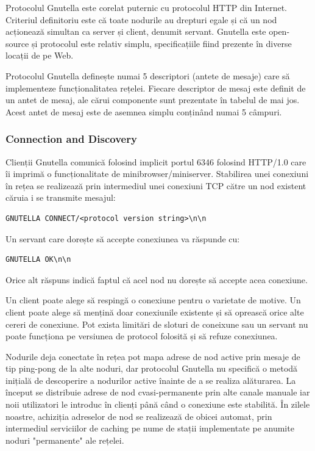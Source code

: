 Protocolul Gnutella este corelat puternic cu protocolul HTTP din Internet.
Criteriul definitoriu este că toate nodurile au drepturi egale și că un nod
acționează simultan ca server și client, denumit servant. Gnutella este
open-source și protocolul este relativ simplu, specificațiile fiind prezente
în diverse locații de pe Web.

Protocolul Gnutella definește numai 5 descriptori (antete de mesaje) care să
implementeze funcționalitatea rețelei. Fiecare descriptor de mesaj este
definit de un antet de mesaj, ale cărui componente sunt prezentate în tabelul
de mai jos. Acest antet de mesaj este de asemnea simplu conținând numai 5
câmpuri.

\subsubsection{Connection and Discovery}

Clienții Gnutella comunică folosind implicit portul 6346 folosind HTTP/1.0
care îi imprimă o funcționalitate de minibrowser/miniserver. Stabilirea unei
conexiuni în rețea se realizează prin intermediul unei conexiuni TCP către un
nod existent căruia i se transmite mesajul:

\begin{verbatim}
GNUTELLA CONNECT/<protocol version string>\n\n
\end{verbatim}

Un servant care dorește să accepte conexiunea va răspunde cu:
\begin{verbatim}
GNUTELLA OK\n\n
\end{verbatim}

Orice alt răspuns indică faptul că acel nod nu dorește să accepte acea
conexiune.

Un client poate alege să respingă o conexiune pentru o varietate de motive. Un
client poate alege să mențină doar conexiunile existente și să oprească orice
alte cereri de conexiune. Pot exista limitări de sloturi de coneixune sau un
servant nu poate funcționa pe versiunea de protocol folosită și să refuze
conexiunea.

Nodurile deja conectate în rețea pot mapa adrese de nod active prin mesaje de
tip ping-pong de la alte noduri, dar protocolul Gnutella nu specifică o metodă
inițială de descoperire a nodurilor active înainte de a se realiza alăturarea.
La început se distribuie adrese de nod cvasi-permanente prin alte canale
manuale iar noii utilizatori le introduc în clienți până când o conexiune este
stabilită. În zilele noastre, achiziția adreselor de nod se realizează de
obicei automat, prin intermediul serviciilor de caching pe nume de stații
implementate pe anumite noduri "permanente" ale rețelei.

